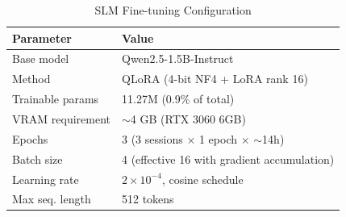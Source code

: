 \begin{table}[htbp]
\centering
\caption{SLM Fine-tuning Configuration}
\label{tab:slm-config}
\begin{tabular}{@{}ll@{}}
\toprule
\textbf{Parameter} & \textbf{Value} \\
\midrule
Base model       & Qwen2.5-1.5B-Instruct \\
Method           & QLoRA (4-bit NF4 + LoRA rank 16) \\
Trainable params & 11.27M (0.9\% of total) \\
VRAM requirement & $\sim$4 GB (RTX 3060 6GB) \\
Epochs           & 3 (3 sessions $\times$ 1 epoch $\times$ $\sim$14h) \\
Batch size       & 4 (effective 16 with gradient accumulation) \\
Learning rate    & $2 \times 10^{-4}$, cosine schedule \\
Max seq. length  & 512 tokens \\
\bottomrule
\end{tabular}
\end{table}